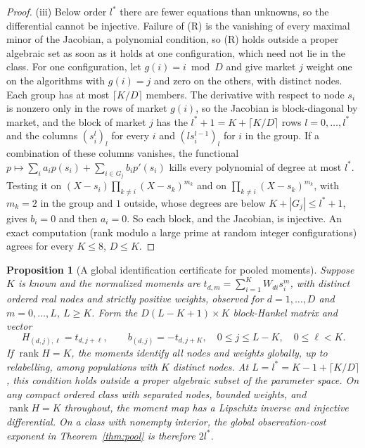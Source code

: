 \documentclass[12pt]{article}
\newtheorem{proposition}[theorem]{Proposition}
\theoremstyle{definition}
\theoremstyle{remark}
\begin{document}
\begin{proof}
(iii) Below order $l^*$ there are fewer equations than unknowns, so the differential cannot be injective. Failure of (R) is the vanishing of every maximal minor of the Jacobian, a polynomial condition, so (R) holds outside a proper algebraic set as soon as it holds at one configuration, which need not lie in the class. For one configuration, let $g(i)=i\bmod D$ and give market $j$ weight one on the algorithms with $g(i)=j$ and zero on the others, with distinct nodes. Each group has at most $\lceil K/D\rceil$ members. The derivative with respect to node $s_i$ is nonzero only in the rows of market $g(i)$, so the Jacobian is block-diagonal by market, and the block of market $j$ has the $l^*+1=K+\lceil K/D\rceil$ rows $l=0,\ldots,l^*$ and the columns $(s_i^l)_l$ for every $i$ and $(l s_i^{l-1})_l$ for $i$ in the group. If a combination of these columns vanishes, the functional $p\mapsto\sum_ia_ip(s_i)+\sum_{i\in G_j}b_ip'(s_i)$ kills every polynomial of degree at most $l^*$. Testing it on $(X-s_i)\prod_{k\ne i}(X-s_k)^{m_k}$ and on $\prod_{k\ne i}(X-s_k)^{m_k}$, with $m_k=2$ in the group and $1$ outside, whose degrees are below $K+|G_j|\le l^*+1$, gives $b_i=0$ and then $a_i=0$. So each block, and the Jacobian, is injective. An exact computation (rank modulo a large prime at random integer configurations) agrees for every $K\le8$, $D\le K$.
\end{proof}

\begin{proposition}[A global identification certificate for pooled moments]\label{prop:poolcertificate}
Suppose $K$ is known and the normalized moments are $t_{d,m}=\sum_{i=1}^K W_{di}s_i^m$, with distinct ordered real nodes and strictly positive weights, observed for $d=1,\ldots,D$ and $m=0,\ldots,L$, $L\ge K$. Form the $D(L-K+1)\times K$ block-Hankel matrix and vector
\[
H_{(d,j),\ell}=t_{d,j+\ell},\qquad b_{(d,j)}=-t_{d,j+K},
\quad 0\le j\le L-K,\quad0\le\ell<K.
\]
If $\operatorname{rank}H=K$, the moments identify all nodes and weights globally, up to relabelling, among populations with $K$ distinct nodes. At $L=l^*=K-1+\lceil K/D\rceil$, this condition holds outside a proper algebraic subset of the parameter space. On any compact ordered class with separated nodes, bounded weights, and $\operatorname{rank}H=K$ throughout, the moment map has a Lipschitz inverse and injective differential. On a class with nonempty interior, the global observation-cost exponent in Theorem~\ref{thm:pool} is therefore $2l^*$.
\end{proposition}
\end{document}
